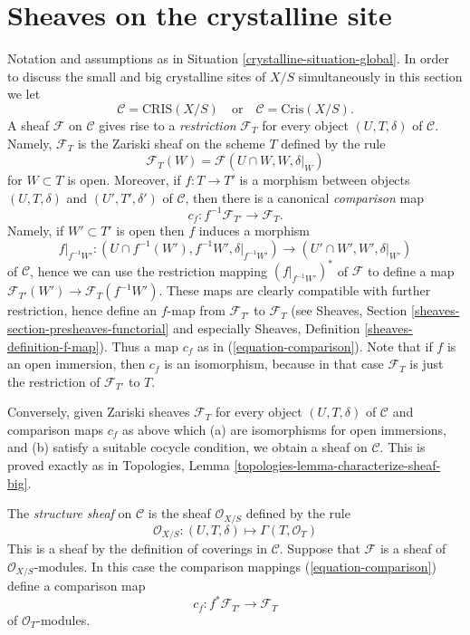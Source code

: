 \section{Sheaves on the crystalline site}
\label{crystalline-section-sheaves}
Notation and assumptions as in Situation \ref{crystalline-situation-global}.
In order to discuss the small and big crystalline sites of $X/S$
simultaneously in this section we let
$$
\mathcal{C} = \text{CRIS}(X/S)
\quad\text{or}\quad
\mathcal{C} = \text{Cris}(X/S).
$$
A sheaf $\mathcal{F}$ on $\mathcal{C}$ gives rise to
a {\it restriction} $\mathcal{F}_T$ for every object $(U, T, \delta)$
of $\mathcal{C}$. Namely, $\mathcal{F}_T$ is the Zariski sheaf on
the scheme $T$ defined by the rule
$$
\mathcal{F}_T(W) = \mathcal{F}(U \cap W, W, \delta|_W)
$$
for $W \subset T$ is open. Moreover, if $f : T \to T'$ is a morphism
between objects
$(U, T, \delta)$ and $(U', T', \delta')$ of $\mathcal{C}$, then there
is a canonical {\it comparison} map
\begin{equation}
\label{equation-comparison}
c_f : f^{-1}\mathcal{F}_{T'} \longrightarrow \mathcal{F}_T.
\end{equation}
Namely, if $W' \subset T'$ is open then $f$ induces a morphism
$$
f|_{f^{-1}W'} :
(U \cap f^{-1}(W'), f^{-1}W', \delta|_{f^{-1}W'})
\longrightarrow
(U' \cap W', W', \delta|_{W'})
$$
of $\mathcal{C}$, hence we can use the restriction mapping
$(f|_{f^{-1}W'})^*$ of $\mathcal{F}$ to define a map
$\mathcal{F}_{T'}(W') \to \mathcal{F}_T(f^{-1}W')$.
These maps are clearly compatible with further restriction, hence
define an $f$-map from $\mathcal{F}_{T'}$ to $\mathcal{F}_T$ (see
Sheaves, Section \ref{sheaves-section-presheaves-functorial}
and especially
Sheaves, Definition \ref{sheaves-definition-f-map}).
Thus a map $c_f$ as in (\ref{equation-comparison}).
Note that if $f$ is an open immersion, then $c_f$ is an
isomorphism, because in that case $\mathcal{F}_T$ is just
the restriction of $\mathcal{F}_{T'}$ to $T$.

\medskip\noindent
Conversely, given Zariski sheaves $\mathcal{F}_T$ for every object
$(U, T, \delta)$ of $\mathcal{C}$ and comparison maps
$c_f$ as above which (a) are isomorphisms for open immersions, and (b)
satisfy a suitable cocycle condition, we obtain a sheaf on
$\mathcal{C}$. This is proved exactly as in
Topologies, Lemma \ref{topologies-lemma-characterize-sheaf-big}.

\medskip\noindent
The {\it structure sheaf} on $\mathcal{C}$ is the sheaf
$\mathcal{O}_{X/S}$ defined by the rule
$$
\mathcal{O}_{X/S} :
(U, T, \delta)
\longmapsto
\Gamma(T, \mathcal{O}_T)
$$
This is a sheaf by the definition of coverings in $\mathcal{C}$.
Suppose that $\mathcal{F}$ is a sheaf of $\mathcal{O}_{X/S}$-modules.
In this case the comparison mappings (\ref{equation-comparison})
define a comparison map
\begin{equation}
\label{equation-comparison-modules}
c_f : f^*\mathcal{F}_{T'} \longrightarrow \mathcal{F}_T
\end{equation}
of $\mathcal{O}_T$-modules.

